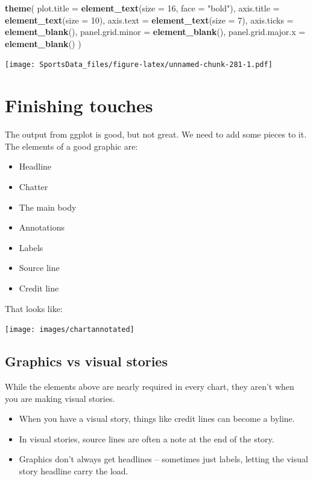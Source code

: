 \documentclass[
]{book}
\newenvironment{Shaded}{\begin{snugshade}}{\end{snugshade}}
\newcommand{\DataTypeTok}[1]{\textcolor[rgb]{0.13,0.29,0.53}{#1}}
\newcommand{\DecValTok}[1]{\textcolor[rgb]{0.00,0.00,0.81}{#1}}
\newcommand{\KeywordTok}[1]{\textcolor[rgb]{0.13,0.29,0.53}{\textbf{#1}}}
\newcommand{\NormalTok}[1]{#1}
\newcommand{\StringTok}[1]{\textcolor[rgb]{0.31,0.60,0.02}{#1}}
\providecommand{\tightlist}{%
  \setlength{\itemsep}{0pt}\setlength{\parskip}{0pt}}
\begin{document}
\begin{Shaded}
\begin{Highlighting}[]
\StringTok{  }\KeywordTok{theme}\NormalTok{(}
    \DataTypeTok{plot.title =} \KeywordTok{element_text}\NormalTok{(}\DataTypeTok{size =} \DecValTok{16}\NormalTok{, }\DataTypeTok{face =} \StringTok{"bold"}\NormalTok{),}
    \DataTypeTok{axis.title =} \KeywordTok{element_text}\NormalTok{(}\DataTypeTok{size =} \DecValTok{10}\NormalTok{),}
    \DataTypeTok{axis.text =} \KeywordTok{element_text}\NormalTok{(}\DataTypeTok{size =} \DecValTok{7}\NormalTok{),}
    \DataTypeTok{axis.ticks =} \KeywordTok{element_blank}\NormalTok{(),}
    \DataTypeTok{panel.grid.minor =} \KeywordTok{element_blank}\NormalTok{(),}
    \DataTypeTok{panel.grid.major.x =} \KeywordTok{element_blank}\NormalTok{()}
\NormalTok{  )}
\end{Highlighting}
\end{Shaded}

\texttt{[image: SportsData\_files/figure-latex/unnamed-chunk-281-1.pdf]}

\hypertarget{finishing-touches}{%
\chapter{Finishing touches}\label{finishing-touches}}

The output from ggplot is good, but not great. We need to add some pieces to it. The elements of a good graphic are:

\begin{itemize}
\tightlist
\item
  Headline
\item
  Chatter
\item
  The main body
\item
  Annotations
\item
  Labels
\item
  Source line
\item
  Credit line
\end{itemize}

That looks like:

\texttt{[image: images/chartannotated]}

\hypertarget{graphics-vs-visual-stories}{%
\section{Graphics vs visual stories}\label{graphics-vs-visual-stories}}

While the elements above are nearly required in every chart, they aren't when you are making visual stories.

\begin{itemize}
\tightlist
\item
  When you have a visual story, things like credit lines can become a byline.
\item
  In visual stories, source lines are often a note at the end of the story.
\item
  Graphics don't always get headlines -- sometimes just labels, letting the visual story headline carry the load.
\end{itemize}
\end{document}
